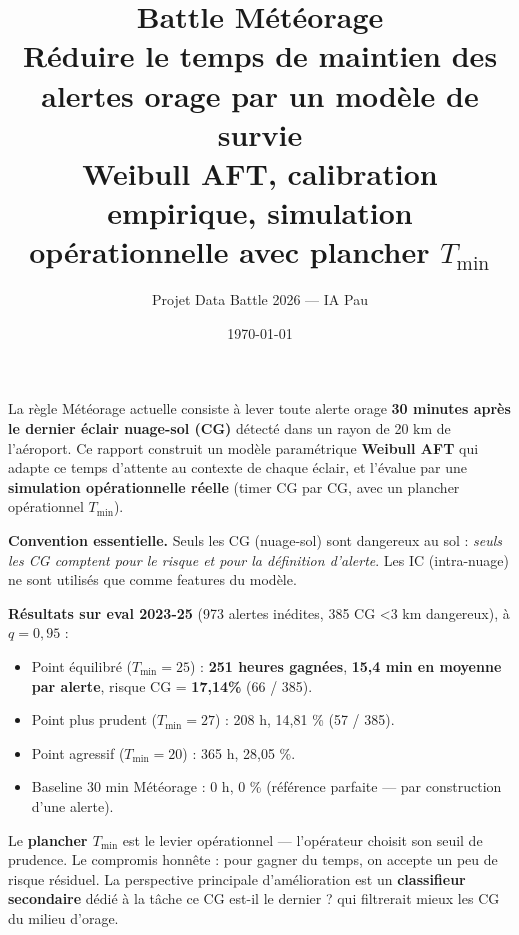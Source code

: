 \documentclass[11pt,a4paper]{article}
\title{
    \textbf{Battle Météorage} \\[0.4em]
    \large Réduire le temps de maintien des alertes orage par un modèle de survie \\
    \small Weibull AFT, calibration empirique, simulation opérationnelle avec plancher $T_{\min}$
}
\author{Projet Data Battle 2026 — IA Pau}
\date{\today}
\begin{document}
\maketitle

\begin{tcolorbox}[colback=blue!5,colframe=blue!50!black,title=\textbf{Résumé exécutif}]
La règle Météorage actuelle consiste à lever toute alerte orage \textbf{30 minutes après le
dernier éclair nuage-sol (CG)} détecté dans un rayon de 20 km de l'aéroport. Ce rapport
construit un modèle paramétrique \textbf{Weibull AFT} qui adapte ce temps d'attente au contexte
de chaque éclair, et l'évalue par une \textbf{simulation opérationnelle réelle} (timer CG par
CG, avec un plancher opérationnel $T_{\min}$).

\medskip

\textbf{Convention essentielle.} Seuls les CG (nuage-sol) sont dangereux au sol :
\emph{seuls les CG comptent pour le risque et pour la définition d'alerte}. Les IC
(intra-nuage) ne sont utilisés que comme features du modèle.

\medskip

\textbf{Résultats sur eval 2023-25} (973 alertes inédites, 385 CG <3 km dangereux), à
$q = 0{,}95$ :
\begin{itemize}[leftmargin=*,topsep=2pt]
    \item Point équilibré ($T_{\min} = 25$) : \textbf{251 heures gagnées}, \textbf{15,4 min en
    moyenne par alerte}, risque CG = \textbf{17,14\%} (66 / 385).
    \item Point plus prudent ($T_{\min} = 27$) : 208 h, 14,81 \% (57 / 385).
    \item Point agressif ($T_{\min} = 20$) : 365 h, 28,05 \%.
    \item Baseline 30 min Météorage : 0 h, 0 \% (référence parfaite — par construction d'une alerte).
\end{itemize}

\medskip

Le \textbf{plancher $T_{\min}$} est le levier opérationnel — l'opérateur choisit son seuil
de prudence. Le compromis honnête : pour gagner du temps, on accepte un peu de risque
résiduel. La perspective principale d'amélioration est un \textbf{classifieur secondaire}
dédié à la tâche \og ce CG est-il le dernier ? \fg{} qui filtrerait mieux les CG du milieu
d'orage.
\end{tcolorbox}

\tableofcontents
\newpage

\end{document}
